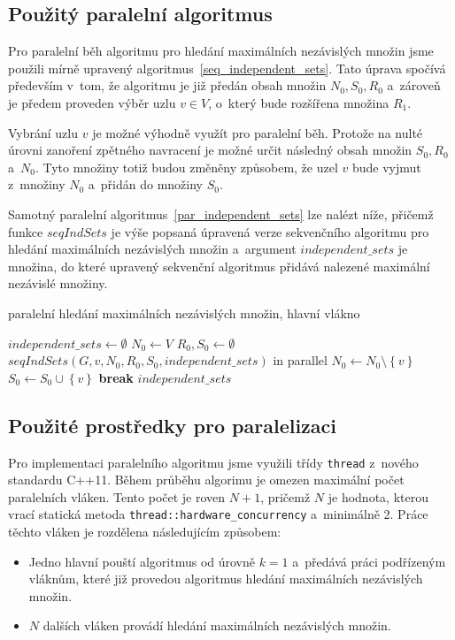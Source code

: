 \documentclass[12pt]{article}
\newcommand{\setHelper}[1]{\left\lbrace #1 \right\rbrace}
\begin{document}
\subsection{Použitý paralelní algoritmus}
Pro paralelní běh algoritmu pro hledání maximálních nezávislých množin jsme použili mírně upravený algoritmus~\ref{seq_independent_sets}. Tato úprava spočívá především v~tom, že algoritmu je již předán obsah množin $N_0, S_0, R_0$ a~zároveň je předem proveden výběr uzlu $v \in V$, o~který bude rozšířena množina $R_1$. 

Vybrání uzlu $v$ je možné výhodně využít pro paralelní běh. Protože na nulté úrovni zanoření zpětného navracení je možné určit následný obsah množin $S_0, R_0$ a~$N_0$. Tyto množiny totiž budou změněny způsobem, že uzel $v$ bude vyjmut z~množiny $N_0$ a~přidán do množiny $S_0$.

Samotný paralelní algoritmus~\ref{par_independent_sets} lze nalézt níže, přičemž funkce $seqIndSets$ je výše popsaná úpravená verze sekvenčního algoritmu pro hledání maximálních nezávislých množin a~argument $independent\_sets$ je množina, do které upravený sekvenční algoritmus přidává nalezené maximální nezávislé množiny. 

\begin{algorithm}[H]
\caption{paralelní hledání maximálních nezávislých množin, hlavní vlákno}
\label{par_independent_sets}
\begin{algorithmic}
\State $independent\_sets \leftarrow \emptyset$
\State $N_0 \leftarrow V$
\State $R_0, S_0 \leftarrow \emptyset$
    \State $seqIndSets(G, v, N_0, R_0, S_0, independent\_sets)$ in parallel
    \State $N_0 \leftarrow N_0 \setminus \setHelper{v}$
    \State $S_0 \leftarrow S_0 \cup \setHelper{v}$
        \State \textbf{break}
    \EndIf
\EndFor
\State \Return $independent\_sets$
\EndFunction
\end{algorithmic}
\end{algorithm}


\subsection{Použité prostředky pro paralelizaci}
Pro implementaci paralelního algoritmu jsme využili třídy \texttt{thread} z~nového standardu C++11. Během průběhu algorimu je omezen maximální počet paralelních vláken. Tento počet je roven $N+1$, pričemž $N$ je hodnota, kterou vrací statická metoda \texttt{thread::hardware\_concurrency} a~minimálně 2. Práce těchto vláken je rozdělena následujícím způsobem:
\begin{itemize}
    \item Jedno hlavní pouští algoritmus od úrovně $k=1$ a~předává práci podřízeným vláknům, které již provedou algoritmus hledání maximálních nezávislých množin.
    \item $N$ dalších vláken provádí hledání maximálních nezávislých množin.
\end{itemize}
\end{document}
